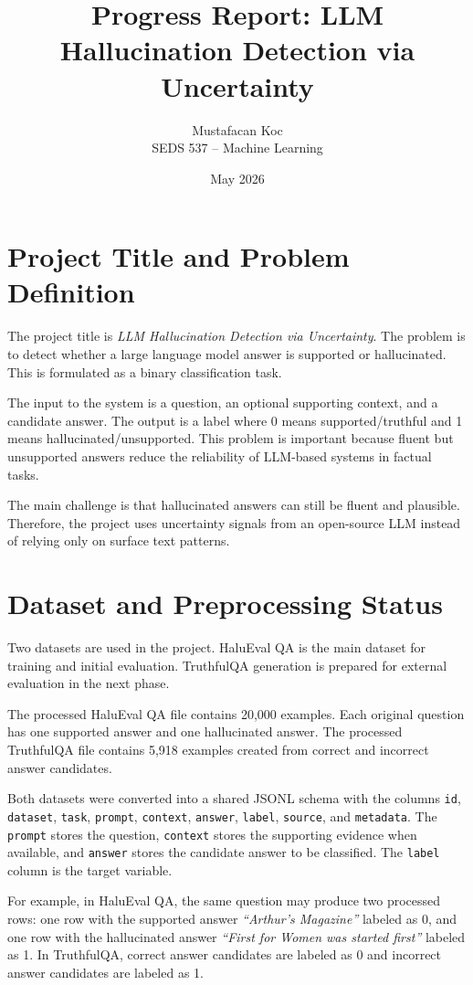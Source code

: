 \documentclass[11pt]{article}
\title{\textbf{Progress Report: LLM Hallucination Detection via Uncertainty}}
\author{Mustafacan Koc\\SEDS 537 -- Machine Learning}
\date{May 2026}
\begin{document}
\maketitle

\section{Project Title and Problem Definition}

The project title is \textit{LLM Hallucination Detection via Uncertainty}. The problem is to detect whether a large language model answer is supported or hallucinated. This is formulated as a binary classification task.

The input to the system is a question, an optional supporting context, and a candidate answer. The output is a label where 0 means supported/truthful and 1 means hallucinated/unsupported. This problem is important because fluent but unsupported answers reduce the reliability of LLM-based systems in factual tasks.

The main challenge is that hallucinated answers can still be fluent and plausible. Therefore, the project uses uncertainty signals from an open-source LLM instead of relying only on surface text patterns.

\section{Dataset and Preprocessing Status}

Two datasets are used in the project. HaluEval QA is the main dataset for training and initial evaluation. TruthfulQA generation is prepared for external evaluation in the next phase.

The processed HaluEval QA file contains 20,000 examples. Each original question has one supported answer and one hallucinated answer. The processed TruthfulQA file contains 5,918 examples created from correct and incorrect answer candidates.

Both datasets were converted into a shared JSONL schema with the columns \texttt{id}, \texttt{dataset}, \texttt{task}, \texttt{prompt}, \texttt{context}, \texttt{answer}, \texttt{label}, \texttt{source}, and \texttt{metadata}. The \texttt{prompt} stores the question, \texttt{context} stores the supporting evidence when available, and \texttt{answer} stores the candidate answer to be classified. The \texttt{label} column is the target variable.

For example, in HaluEval QA, the same question may produce two processed rows: one row with the supported answer \textit{``Arthur's Magazine''} labeled as 0, and one row with the hallucinated answer \textit{``First for Women was started first''} labeled as 1. In TruthfulQA, correct answer candidates are labeled as 0 and incorrect answer candidates are labeled as 1.
\end{document}
